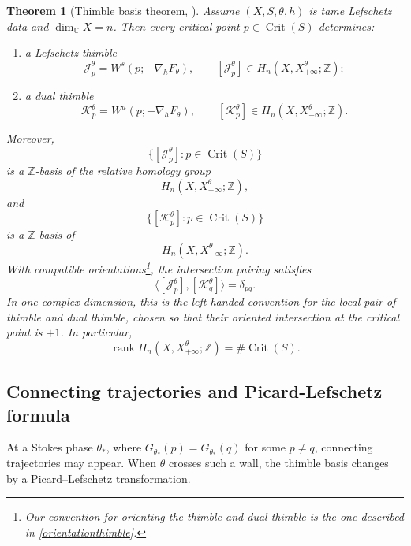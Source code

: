 \documentclass[11pt]{amsart}
\theoremstyle{plain}
\newtheorem{thm}{Theorem}[section]
\newcommand{\C}{\mathbb C}
\newcommand{\Z}{\mathbb Z}
\newcommand{\Crit}{\operatorname{Crit}}
\newcommand{\J}{\mathcal J}
\newcommand{\Kk}{\mathcal K}
\begin{document}
\begin{thm}[Thimble basis theorem, \cite{Pham1983,Vassiliev2002,Witten2011CS}]\label{thm:thimble-basis}
Assume $(X,S,\theta,h)$ is tame Lefschetz data and $\dim_\C X=n$.  Then every critical point $p\in\Crit(S)$ determines:
\begin{enumerate}[label={\textup{(\roman*)}}, leftmargin=2.5em]
\item a Lefschetz thimble
\[
\J_p^\theta=W^s(p;-\nabla_h F_{\theta}),
\qquad
[\J_p^\theta]\in H_n(X,X_{+\infty}^\theta;\Z);
\]
\item a dual thimble
\[
\Kk_p^\theta=W^u(p;-\nabla_h  F_{\theta}),
\qquad
[\Kk_p^\theta]\in H_n(X,X_{-\infty}^\theta;\Z).
\]
\end{enumerate}
Moreover,
\begin{equation*}\label{eq:basis-positive}
\bigl\{[\J_p^\theta]:p\in\Crit(S)\bigr\}
\end{equation*}
is a $\Z$-basis of the relative homology group
\[
H_n(X,X_{+\infty}^\theta;\Z),
\]
and
\begin{equation*}\label{eq:basis-negative}
\bigl\{[\Kk_p^\theta]:p\in\Crit(S)\bigr\}
\end{equation*}
is a $\Z$-basis of
\[
H_n(X,X_{-\infty}^\theta;\Z).
\]
With compatible orientations\footnote{Our convention for orienting the
thimble and dual thimble is the one described in
\eqref{orientationthimble}. }, the intersection pairing satisfies
\begin{equation*}\label{eq:dual-pairing}
\langle[\J_p^\theta],[\Kk_q^\theta]\rangle=\delta_{pq}.
\end{equation*}
In one complex dimension, this is the left-handed convention for the local
pair of thimble and dual thimble, chosen so that their oriented intersection
at the critical point is \(+1\). In particular,
\begin{equation*}\label{eq:rank-count}
\operatorname{rank}H_n(X,X_{+\infty}^\theta;\Z)
=\#\Crit(S).
\end{equation*}
\end{thm}



\smallskip
\subsection{Connecting trajectories and Picard-Lefschetz formula}


At a Stokes phase $\theta_*$, where $G_{\theta_*}(p)=G_{\theta_*}(q)$ for some $p\ne q$, connecting trajectories may appear.  When $\theta$ crosses such a wall, the thimble basis changes by a Picard--Lefschetz transformation.  
\end{document}
